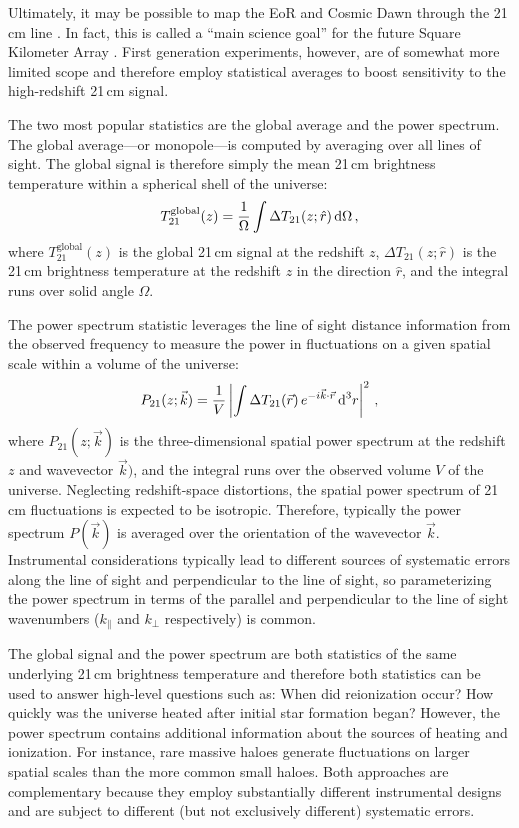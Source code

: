 \begin{bibunit}
Ultimately, it may be possible to map the EoR and Cosmic Dawn through the 21\,cm line
\citep{1997ApJ...475..429M}. In fact, this is called a ``main science goal'' for the future Square
Kilometer Array \citep[SKA;][]{2013ExA....36..235M}.  First generation experiments, however, are of
somewhat more limited scope and therefore employ statistical averages to boost sensitivity to the
high-redshift 21\,cm signal.

The two most popular statistics are the global average and the power spectrum. The global
average---or monopole---is computed by averaging over all lines of sight. The global signal is
therefore simply the mean 21\,cm brightness temperature within a spherical shell of the universe:
\begin{equation}
    T^\text{global}_{21}(z) = \frac{1}{\Omega}\int \Delta T_{21}(z; \hat{r}) \, {\textrm d}\Omega \,,
\end{equation}
where $T^\text{global}_{21}(z)$ is the global 21\,cm signal at the redshift $z$, $\Delta
T_{21}(z; \hat{r})$ is the 21\,cm brightness temperature at the redshift $z$ in the direction
$\hat{r}$, and the integral runs over solid angle $\Omega$.

The power spectrum statistic leverages the line of sight distance information from the observed
frequency to measure the power in fluctuations on a given spatial scale within a volume of the
universe:
\begin{equation}
    P_{21}(z; \vec{k}) =
        \frac{1}{V}\left|
        \int \Delta T_{21}(\vec{r}) \, e^{-i\vec{k}\cdot\vec{r}} \, {\textrm d}^3r
        \right|^2\,,
\end{equation}
where $P_{21}(z; \vec{k})$ is the three-dimensional spatial power spectrum at the redshift $z$ and
wavevector $\vec{k})$, and the integral runs over the observed volume $V$ of the universe.
Neglecting redshift-space distortions, the spatial power spectrum of 21\,cm fluctuations is expected
to be isotropic. Therefore, typically the power spectrum $P(\vec{k})$ is averaged over the
orientation of the wavevector $\vec{k}$. Instrumental considerations typically lead to different
sources of systematic errors along the line of sight and perpendicular to the line of sight, so
parameterizing the power spectrum in terms of the parallel and perpendicular to the line of sight
wavenumbers ($k_\parallel$ and $k_\perp$ respectively) is common.

The global signal and the power spectrum are both statistics of the same underlying 21\,cm
brightness temperature and therefore both statistics can be used to answer high-level questions such
as: When did reionization occur? How quickly was the universe heated after initial star formation
began?  However, the power spectrum contains additional information about the sources of heating and
ionization.  For instance, rare massive haloes generate fluctuations on larger spatial scales than
the more common small haloes.  Both approaches are complementary because they employ substantially
different instrumental designs and are subject to different (but not exclusively different)
systematic errors.


\end{bibunit}
